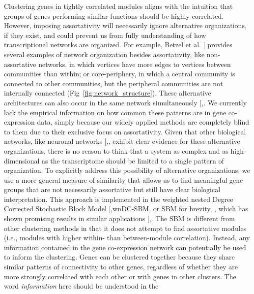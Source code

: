 \documentclass[
]{article}
\begin{document}
Clustering genes in tightly correlated modules aligns with the intuition
that groups of genes performing similar functions should be highly
correlated. However, imposing assortativity will necessarily ignore
alternative organizations, if they exist, and could prevent us from
fully understanding of how transcriptional networks are organized. For
example, Betzel et al. {[}\citeproc{ref-Betzel2018-ec}{12}{]} provides
several examples of network organization besides assortativity, like
non-assortative networks, in which vertices have more edges to vertices
between communities than within; or core-periphery, in which a central
community is connected to other communities, but the peripheral
communities are not internally connected
(Fig~\ref{fig:network_structure}). These alternative architectures can
also occur in the same network simultaneously
{[},\citeproc{ref-Peel2018-ai}{13}{]}.
We currently lack the empirical information on how common these patterns
are in gene co-expression data, simply because our widely applied
methods are completely blind to them due to their exclusive focus on
assortativity. Given that other biological networks, like neuronal
networks
{[},\citeproc{ref-Peixoto2018-or}{14}{]},
exhibit clear evidence for these alternative organizations, there is no
reason to think that a system as complex and as high-dimensional as the
transcriptome should be limited to a single pattern of organization. To
explicitly address this possibility of alternative organizations, we use
a more general measure of similarity that allows us to find meaningful
gene groups that are not necessarily assortative but still have clear
biological interpretation. This approach is implemented in the weighted
nested Degree Corrected Stochastic Block Model
{[},wnDC-SBM, or SBM for brevity,
\citeproc{ref-Peixoto2017-zw}{15}{]}, which has shown promising results
in similar applications
{[},\citeproc{ref-Morelli2021-ge}{17}{]}.
The SBM is different from other clustering methods in that it does not
attempt to find assortative modules (i.e., modules with higher within-
than between-module correlation). Instead, any information contained in
the gene co-expression network can potentially be used to inform the
clustering. Genes can be clustered together because they share similar
patterns of connectivity to other genes, regardless of whether they are
more strongly correlated with each other or with genes in other
clusters. The word \emph{information} here should be understood in the
\end{document}
